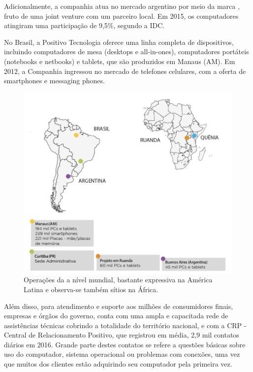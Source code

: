 Adicionalmente, a companhia atua no mercado argentino por meio da marca \nomePositivoAr{}, fruto de uma joint venture\cite{jointVenture2010} com um parceiro local. Em 2015, os computadores \nomePositivoAr{} atingiram uma participação de 9,5\%, segundo a IDC.

No Brasil, a Positivo Tecnologia oferece uma linha completa de dispositivos, incluindo computadores de mesa (desktops e all-in-ones), computadores portáteis (notebooks e netbooks) e tablets, que são produzidos em Manaus (AM). Em 2012, a Companhia ingressou no mercado de telefones celulares, com a oferta de smartphones e messaging phones.

\begin{figure}[h]
\begin{centering}
\includegraphics[width=1.0\textwidth]{Img/PositivoMundo}
\caption{Operações da \nomePositivo{} a nível mundial, bastante expressiva na América Latina e observa-se também sítios na África.}
\par\end{centering}
\end{figure}

Além disso, para atendimento e suporte aos milhões de consumidores finais, empresas e órgãos do governo, conta com uma ampla e capacitada rede de assistências técnicas cobrindo a totalidade do território nacional, e com a CRP - Central de Relacionamento Positivo, que registrou em média, 2,9 mil contatos diários em 2016. Grande parte destes contatos se refere a questões básicas sobre uso do computador, sistema operacional ou problemas com conexões, uma vez que muitos dos clientes estão adquirindo seu computador pela primeira vez.

